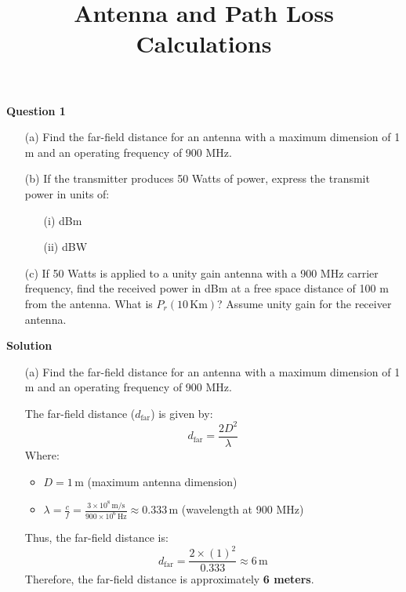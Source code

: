 \documentclass[12pt]{article}
\title{Antenna and Path Loss Calculations}
\author{}
\date{}
\begin{document}
	\setlength{\topskip}{0pt}
	\setlength{\parskip}{0pt}
	\maketitle
	\vspace{-0.9in} %
	\begin{flushleft}
		\fontsize{12}{15}\selectfont
		
		\textbf{Question 1}
		
		\begin{enumerate}
			\item[(a)] Find the far-field distance for an antenna with a maximum dimension of 1 m and an operating frequency of 900 MHz.
			
			\item[(b)] If the transmitter produces 50 Watts of power, express the transmit power in units of:
			\begin{enumerate}
				\item[(i)] dBm
				\item[(ii)] dBW
			\end{enumerate}
			
			\item[(c)] If 50 Watts is applied to a unity gain antenna with a 900 MHz carrier frequency, find the received power in dBm at a free space distance of 100 m from the antenna. What is \(P_r(10 \, \text{Km})\)? Assume unity gain for the receiver antenna.
		\end{enumerate}
		
		\vspace{0.5cm}
		
		\textbf{Solution}
		\begin{enumerate}
			\item[(a)] Find the far-field distance for an antenna with a maximum dimension of 1 m and an operating frequency of 900 MHz.
			
			The far-field distance (\(d_{\text{far}}\)) is given by:
			\[
			d_{\text{far}} = \frac{2D^2}{\lambda}
			\]
			Where:
			\begin{itemize}
				\item \(D = 1 \, \text{m}\) (maximum antenna dimension)
				\item \(\lambda = \frac{c}{f} = \frac{3 \times 10^8 \, \text{m/s}}{900 \times 10^6 \, \text{Hz}} \approx 0.333 \, \text{m}\) (wavelength at 900 MHz)
			\end{itemize}
			
			Thus, the far-field distance is:
			\[
			d_{\text{far}} = \frac{2 \times (1)^2}{0.333} \approx 6 \, \text{m}
			\]
			Therefore, the far-field distance is approximately \textbf{6 meters}.
			

\end{enumerate}
\end{flushleft}
\end{document}
